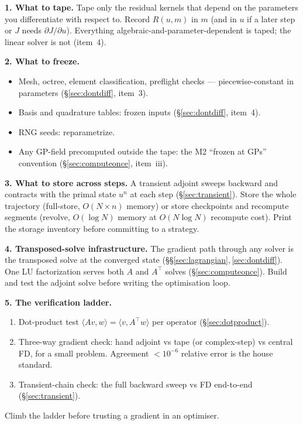 \documentclass[11pt]{article}
\begin{document}
\medskip

\noindent\textbf{1. What to tape.}
Tape only the residual kernels that depend on the parameters you
differentiate with respect to.  Record $R(u, m)$ in $m$ (and in $u$ if
a later step or $J$ needs $\partial J/\partial u$).  Everything
algebraic-and-parameter-dependent is taped; the linear solver is not
(item~4).

\noindent\textbf{2. What to freeze.}
\begin{itemize}
\item Mesh, octree, element classification, preflight checks --- piecewise-constant
  in parameters (\S\ref{sec:dontdiff}, item~3).
\item Basis and quadrature tables: frozen inputs (\S\ref{sec:dontdiff}, item~4).
\item RNG seeds: reparametrize.
\item Any GP-field precomputed outside the tape: the M2 ``frozen at GPs''
  convention (\S\ref{sec:computeonce}, item~iii).
\end{itemize}

\noindent\textbf{3. What to store across steps.}
A transient adjoint sweeps backward and contracts with the primal state
$u^n$ at each step (\S\ref{sec:transient}).  Store the whole trajectory
(full-store, $O(N \times n)$ memory) or store checkpoints and recompute
segments (revolve, $O(\log N)$ memory at $O(N \log N)$ recompute cost).
Print the storage inventory before committing to a strategy.

\noindent\textbf{4. Transposed-solve infrastructure.}
The gradient path through any solver is the transposed solve at the
converged state (\S\S\ref{sec:lagrangian},\,\ref{sec:dontdiff}).  One LU
factorization serves both $A$ and $A^\top$ solves
(\S\ref{sec:computeonce}).  Build and test the adjoint solve before
writing the optimisation loop.

\noindent\textbf{5. The verification ladder.}
\begin{enumerate}
\item[(a)] Dot-product test $\langle Av,w\rangle = \langle v,A^\top w\rangle$
  per operator (\S\ref{sec:dotproduct}).
\item[(b)] Three-way gradient check: hand adjoint vs tape (or complex-step)
  vs central FD, for a small problem.  Agreement $< 10^{-6}$ relative
  error is the house standard.
\item[(c)] Transient-chain check: the full backward sweep vs FD end-to-end
  (\S\ref{sec:transient}).
\end{enumerate}
Climb the ladder before trusting a gradient in an optimiser.
\end{document}
